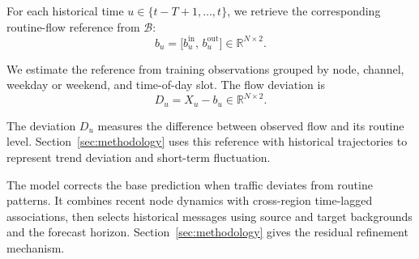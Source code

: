 For each historical time \(u\in\{t-T+1,\ldots,t\}\), we retrieve the corresponding routine-flow reference from \(\mathcal{B}\):
\begin{equation}
\label{eq:baseline}
b_u=\bigl[b_u^{\mathrm{in}},\,b_u^{\mathrm{out}}\bigr]
\in\mathbb{R}^{N\times 2}.
\end{equation}

We estimate the reference from training observations grouped by node, channel, weekday or weekend, and time-of-day slot. The flow deviation is
\begin{equation}
\label{eq:deviation}
D_u=X_u-b_u\in\mathbb{R}^{N\times 2}.
\end{equation}

The deviation \(D_u\) measures the difference between observed flow and its routine level. Section~\ref{sec:methodology} uses this reference with historical trajectories to represent trend deviation and short-term fluctuation.

The model corrects the base prediction when traffic deviates from routine patterns. It combines recent node dynamics with cross-region time-lagged associations, then selects historical messages using source and target backgrounds and the forecast horizon. Section~\ref{sec:methodology} gives the residual refinement mechanism.
